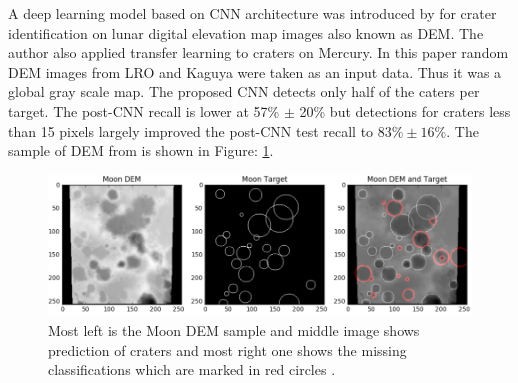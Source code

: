 \documentclass[11pt]{article}
\begin{document}
A deep learning model based on CNN architecture was introduced by \cite{silburt2019lunar} for crater identification on lunar digital elevation map images also known as DEM. The author also applied transfer learning to craters on Mercury. In this paper random DEM images from LRO and Kaguya were taken as an input data. Thus it was a global gray scale map. The proposed CNN detects only half of the caters per target. The post-CNN recall is lower at 57\% $\pm$ 20\% but detections for craters less than 15 pixels largely improved the post-CNN test recall to $83 \% \pm 16 \%$. The sample of DEM from \cite{silburt2019lunar} is shown in Figure: \ref{dem}.


\begin{figure}[ht!]
	\centering
	\includegraphics[width=.8\linewidth]{files/unet/dem.png}
	\caption{Most left is the Moon DEM sample and middle image shows prediction of craters and most right one shows the missing classifications which are marked in red circles \cite{silburt2019lunar}.}
	\label{dem}
\end{figure}






\end{document}
